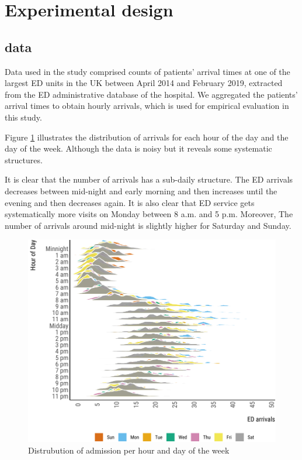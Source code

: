 \documentclass[]{elsarticle} %
\begin{document}
\hypertarget{design}{%
\section{Experimental design}\label{design}}

\hypertarget{data}{%
\subsection{data}\label{data}}

Data used in the study comprised counts of patients' arrival times at one of the largest ED units in the UK between April 2014 and February 2019, extracted from the ED administrative database of the hospital. We aggregated the patients' arrival times to obtain hourly arrivals, which is used for empirical evaluation in this study.

Figure \ref{fig:hourly-plot-ridge} illustrates the distribution of arrivals for each hour of the day and the day of the week. Although the data is noisy but it reveals some systematic structures.

It is clear that the number of arrivals has a sub-daily structure. The ED arrivals decreases between mid-night and early morning and then increases until the evening and then decreases again. It is also clear that ED service gets systematically more visits on Monday between 8 a.m. and 5 p.m. Moreover, The number of arrivals around mid-night is slightly higher for Saturday and Sunday.

\begin{figure}[H]

{\centering \includegraphics{paper_files/figure-latex/hourly-plot-ridge-1} 

}

\caption{Distrubution of admission per hour and day of the week}\label{fig:hourly-plot-ridge}
\end{figure}
\end{document}
